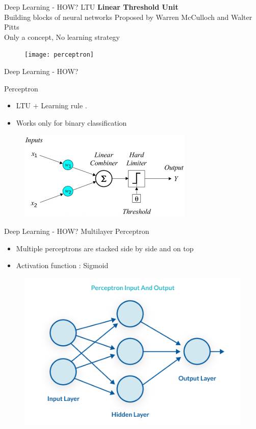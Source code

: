 \documentclass[10pt]{beamer}
\begin{document}
\begin{frame}[fragile]{Deep Learning - HOW?}
LTU 
\textbf{Linear Threshold Unit}\\
Building blocks of neural networks
Proposed by Warren McCulloch and Walter Pitts\\
Only a concept, No learning strategy

    \begin{figure}[ht]
      \hspace*{-1cm}\texttt{[image: perceptron]}
    \end{figure}
\end{frame}
\begin{frame}[fragile]{Deep Learning - HOW?}

Perceptron
    \begin{itemize}
        \item LTU + Learning rule .
\pause        
        \item Works only for binary classification
    \end{itemize}
    \begin{figure}[ht]
      \hspace*{-1cm}\includegraphics[width=0.5\linewidth]{ltu}
    \end{figure}
\end{frame}
\begin{frame}[fragile]{Deep Learning - HOW?}
    Multilayer Perceptron
    \begin{itemize}
        \item Multiple perceptrons are stacked side by side and on top
\pause        
        \item Activation function : Sigmoid
    \end{itemize}
    \begin{figure}[ht]
      \hspace*{-1cm}\includegraphics[width=0.5\linewidth]{mlp}
    \end{figure}
\end{frame}
\end{document}
